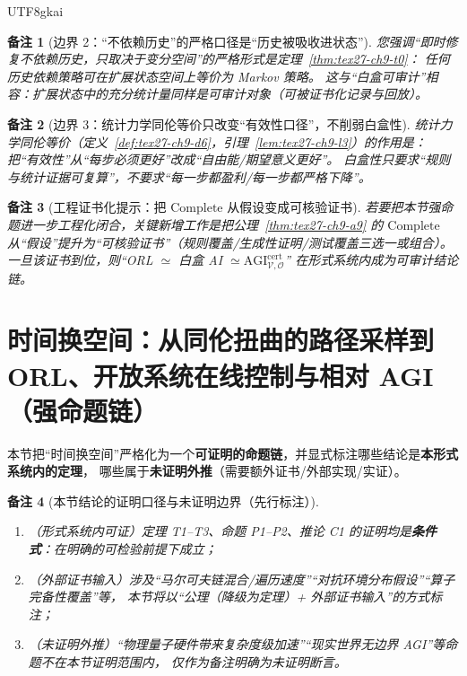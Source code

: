 \documentclass[12pt]{article}
\newtheorem{remark}{备注}[section]
\begin{document}
\begin{CJK*}{UTF8}{gkai}
\begin{remark}[边界 2：“不依赖历史”的严格口径是“历史被吸收进状态”]
\label{rem:tex27-ch9-r2}
您强调“即时修复不依赖历史，只取决于变分空间”的严格形式是定理~\ref{thm:tex27-ch9-t0}：
任何历史依赖策略可在扩展状态空间上等价为 Markov 策略。
这与“白盒可审计”相容：扩展状态中的充分统计量同样是可审计对象（可被证书化记录与回放）。
\end{remark}

\begin{remark}[边界 3：统计力学同伦等价只改变“有效性口径”，不削弱白盒性]
\label{rem:tex27-ch9-r3}
统计力学同伦等价（定义~\ref{def:tex27-ch9-d6}，引理~\ref{lem:tex27-ch9-l3}）的作用是：
把“有效性”从“每步必须更好”改成“自由能/期望意义更好”。
白盒性只要求“规则与统计证据可复算”，不要求“每一步都盈利/每一步都严格下降”。
\end{remark}

\begin{remark}[工程证书化提示：把 $\mathrm{Complete}$ 从假设变成可核验证书]
\label{rem:tex27-ch9-r4}
若要把本节强命题进一步工程化闭合，关键新增工作是把公理~\ref{thm:tex27-ch9-a9} 的 $\mathrm{Complete}$
从“假设”提升为“可核验证书”（规则覆盖/生成性证明/测试覆盖三选一或组合）。
一旦该证书到位，则“ORL $\simeq$ 白盒 AI $\simeq \mathrm{AGI}^{\mathrm{cert}}_{\mathcal{V},\mathcal{O}}$”
在形式系统内成为可审计结论链。
\end{remark}

\section{时间换空间：从同伦扭曲的路径采样到 ORL、开放系统在线控制与相对 AGI（强命题链）}
\label{sec:tex27-ch10-time-space-tradeoff}

本节把“时间换空间”严格化为一个\textbf{可证明的命题链}，并显式标注哪些结论是\textbf{本形式系统内的定理}，
哪些属于\textbf{未证明外推}（需要额外证书/外部实现/实证）。

\begin{remark}[本节结论的证明口径与未证明边界（先行标注）]
\label{rem:tex27-ch10-scope}
\begin{enumerate}
  \item（形式系统内可证）定理 T1--T3、命题 P1--P2、推论 C1 的证明均是\textbf{条件式}：在明确的可检验前提下成立；
  \item（外部证书输入）涉及“马尔可夫链混合/遍历速度”“对抗环境分布假设”“算子完备性覆盖”等，
  本节将以“公理（降级为定理）+ 外部证书输入”的方式标注；
  \item（未证明外推）“物理量子硬件带来复杂度级加速”“现实世界无边界 AGI”等命题不在本节证明范围内，
  仅作为备注明确为未证明断言。
\end{enumerate}
\end{remark}


\end{CJK*}
\end{document}

